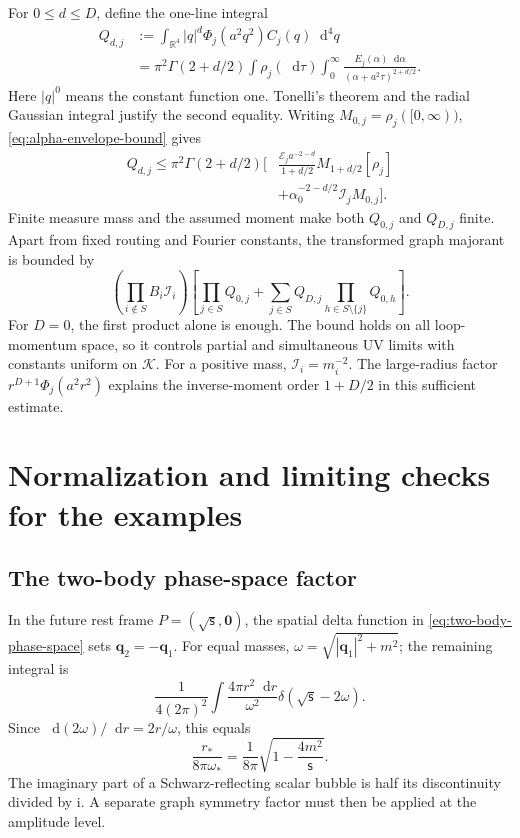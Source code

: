\documentclass[final,5p,times,twocolumn,numbers,nopreprintline]{elsarticle}
\numberwithin{equation}{section}
\theoremstyle{definition}
\theoremstyle{remark}
\newcommand{\dd}{\mathop{}\!\mathrm d}
\newcommand{\ii}{\mathrm i}
\newcommand{\Ph}{\Phi}
\newcommand{\RR}{\mathbb R}
\newcommand{\sMand}{\mathsf{s}}
\begin{document}
For \(0\leq d\leq D\), define the one-line integral
\begin{align}
 Q_{d,j}
 &:=\int_{\RR^4}|q|^d\Ph_j(a^2q^2)C_j(q)\dd^4q \nonumber\\
 &=\pi^2\Gamma(2+d/2)
   \int\rho_j(\dd\tau)\int_0^\infty
   \frac{E_j(\alpha)\dd\alpha}
        {(\alpha+a^2\tau)^{2+d/2}}.
 \label{eq:one-line-moment}
\end{align}
Here \(|q|^0\) means the constant function one. Tonelli's theorem
and the radial Gaussian integral justify the second equality.
Writing \(M_{0,j}=\rho_j([0,\infty))\),
\eqref{eq:alpha-envelope-bound} gives
\begin{align}
 Q_{d,j}\leq\pi^2\Gamma(2+d/2)
 \bigg[&\frac{\mathcal E_j a^{-2-d}}{1+d/2}
           M_{1+d/2}[\rho_j] \nonumber\\
       &+\alpha_0^{-2-d/2}\mathcal I_j M_{0,j}\bigg].
 \label{eq:one-line-moment-bound}
\end{align}
Finite measure mass and the assumed moment make both
\(Q_{0,j}\) and \(Q_{D,j}\) finite. Apart from fixed routing and
Fourier constants, the transformed graph majorant is bounded by
\[
 \left(\prod_{i\notin S}B_i\mathcal I_i\right)
 \left[\prod_{j\in S}Q_{0,j}
   +\sum_{j\in S}Q_{D,j}
        \prod_{h\in S\setminus\{j\}}Q_{0,h}\right].
\]
For \(D=0\), the first product alone is enough. The bound holds
on all loop-momentum space, so it controls partial and simultaneous
UV limits with constants uniform on \(\mathcal K\).
For a positive mass, \(\mathcal I_i=m_i^{-2}\).
The large-radius factor \(r^{D+1}\Ph_j(a^2r^2)\) explains the
inverse-moment order \(1+D/2\) in this sufficient estimate.

\section{Normalization and limiting checks for the examples}
\label{sec:appendix-checks}

\subsection{The two-body phase-space factor}

In the future rest frame \(P=(\sqrt{\sMand},\mathbf0)\),
the spatial delta function in \eqref{eq:two-body-phase-space}
sets \(\mathbf q_2=-\mathbf q_1\).
For equal masses, \(\omega=\sqrt{|\mathbf q_1|^2+m^2}\);
the remaining integral is
\[
 \frac1{4(2\pi)^2}
     \int\frac{4\pi r^2\dd r}{\omega^2}
         \delta(\sqrt{\sMand}-2\omega).
\]
Since \(\dd(2\omega)/\dd r=2r/\omega\), this equals
\[
 \frac{r_*}{8\pi\omega_*}
       =\frac1{8\pi}\sqrt{1-\frac{4m^2}{\sMand}}.
\]
The imaginary part of a Schwarz-reflecting scalar bubble is
half its discontinuity divided by \(\ii\).
A separate graph symmetry factor must then be applied at the
amplitude level.
\end{document}
